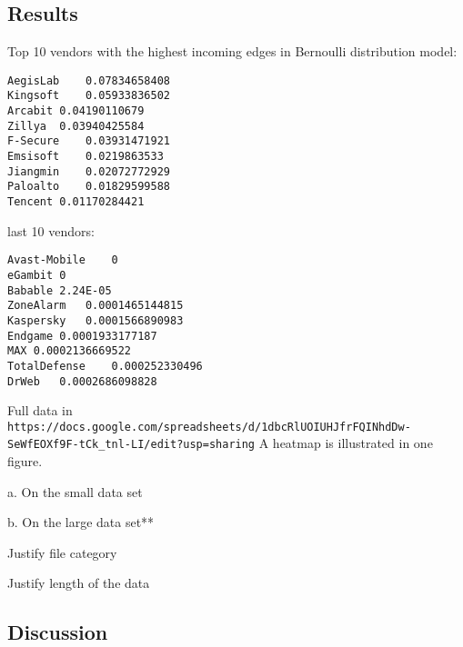 \subsection{Results}
Top 10 vendors with the highest incoming edges in Bernoulli distribution model:
\begin{verbatim}
AegisLab	0.07834658408
Kingsoft	0.05933836502
Arcabit	0.04190110679
Zillya	0.03940425584
F-Secure	0.03931471921
Emsisoft	0.0219863533
Jiangmin	0.02072772929
Paloalto	0.01829599588
Tencent	0.01170284421
\end{verbatim}
last 10 vendors:
\begin{verbatim}
Avast-Mobile	0
eGambit	0
Babable	2.24E-05
ZoneAlarm	0.0001465144815
Kaspersky	0.0001566890983
Endgame	0.0001933177187
MAX	0.0002136669522
TotalDefense	0.000252330496
DrWeb	0.0002686098828\end{verbatim}
Full data in
\verb|https://docs.google.com/spreadsheets/d/1dbcRlUOIUHJfrFQINhdDw-SeWfEOXf9F-tCk_tnl-LI/edit?usp=sharing|
A heatmap is illustrated in one figure. 

a. On the small data set

b. On the large data set**

Justify file category

Justify length of the data

\subsection{Discussion}
